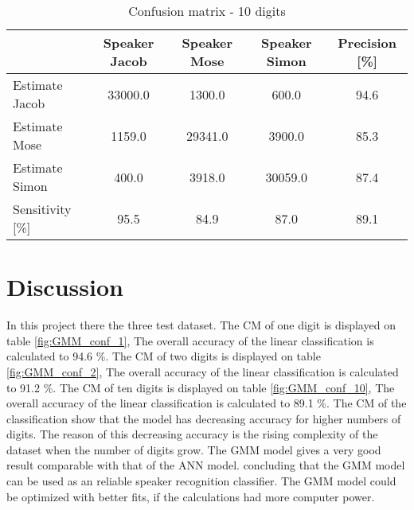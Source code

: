 \begin{table}[H]                          
\centering                                                     
\begin{tabular}{|l|c|c|c|c|}                                   
\hline                                                         
  & Speaker Jacob & Speaker Mose & Speaker Simon & Precision [\%] \\
\hline                                                         
Estimate Jacob & 33000.0 & 1300.0 & 600.0 & 94.6 \\            
\hline                                                         
Estimate Mose & 1159.0 & 29341.0 & 3900.0 & 85.3 \\            
\hline                                                         
Estimate Simon & 400.0 & 3918.0 & 30059.0 & 87.4 \\            
\hline                                                         
Sensitivity [\%] & 95.5 & 84.9 & 87.0 & 89.1 \\                
\hline                                                         
\end{tabular}                                                  
\caption{Confusion matrix - 10 digits}                         
\label{table:GMM_conf_10}                                      
\end{table}

\section{Discussion}
In this project there the three test dataset.
The CM of one digit is displayed on table \ref{fig:GMM_conf_1}, The overall accuracy of the linear classification is  calculated to 94.6 \%.
The CM of two digits is displayed on table \ref{fig:GMM_conf_2}, The overall accuracy of the linear classification is  calculated to 91.2 \%.
The CM of ten digits is displayed on table \ref{fig:GMM_conf_10}, The overall accuracy of the linear classification is  calculated to 89.1 \%.
The CM of the classification show that the model has decreasing accuracy for higher numbers of digits.
The reason of this decreasing accuracy is the rising complexity of the dataset when the number of digits grow.
The GMM model gives a very good result comparable with that of the ANN model. 
concluding that the GMM model can be used as an reliable speaker recognition classifier.
The GMM model could be optimized with better fits, if the calculations had more computer power.













